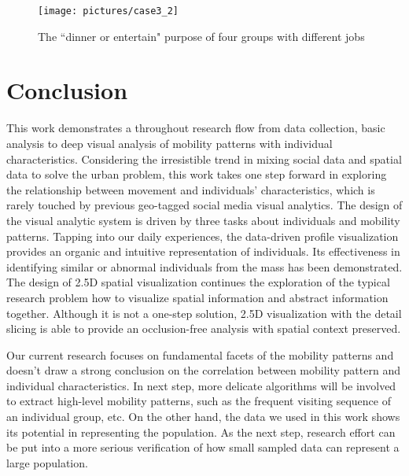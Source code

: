 \begin{figure}[htb!]
 \centering %
 \texttt{[image: pictures/case3\_2]}
 \caption{The ``dinner or entertain" purpose of four groups with different jobs}
 \label{case32}
\end{figure}

\section{Conclusion}
\label{sec:conclusion}

This work demonstrates a throughout research flow from data collection, basic analysis to deep visual analysis of mobility patterns with individual characteristics. Considering the irresistible trend in mixing social data and spatial data to solve the urban problem, this work takes one step forward in exploring the relationship between movement and individuals' characteristics, which is rarely touched by previous geo-tagged social media visual analytics. The design of the visual analytic system is driven by three tasks about individuals and mobility patterns. Tapping into our daily experiences, the data-driven profile visualization provides an organic and intuitive representation of individuals. Its effectiveness in identifying similar or abnormal individuals from the mass has been demonstrated. The design of 2.5D spatial visualization continues the exploration of the typical research problem how to visualize spatial information and abstract information together. Although it is not a one-step solution, 2.5D visualization with the detail slicing is able to provide an occlusion-free analysis with spatial context preserved.

Our current research focuses on fundamental facets of the mobility patterns and doesn't draw a strong conclusion on the correlation between mobility pattern and individual characteristics. In next step, more delicate algorithms will be involved to extract high-level mobility patterns, such as the frequent visiting sequence of an individual group, etc. On the other hand, the data we used in this work shows its potential in representing the population. As the next step, research effort can be put into a more serious verification of how small sampled data can represent a large population.



%




